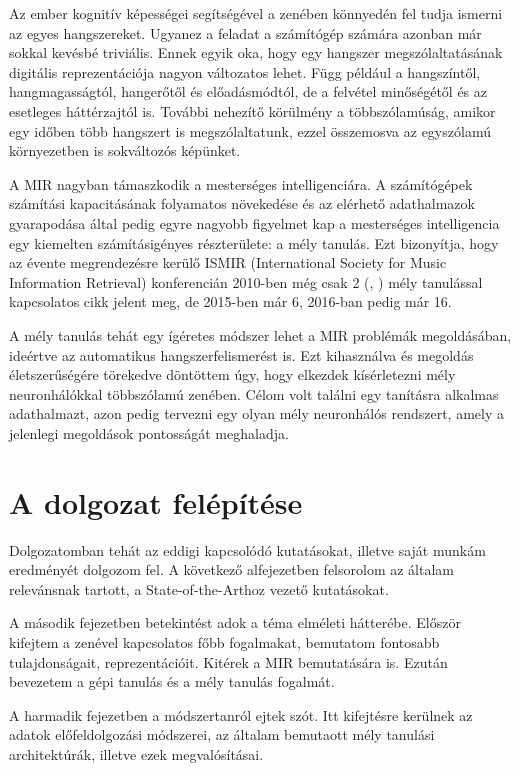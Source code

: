 Az ember kognitív képességei segítségével a zenében könnyedén fel tudja ismerni az egyes hangszereket. Ugyanez a feladat a számítógép számára azonban már sokkal kevésbé triviális. Ennek egyik oka, hogy egy hangszer megszólaltatásának digitális reprezentációja nagyon változatos lehet. Függ például a hangszíntől, hangmagasságtól, hangerőtől és előadásmódtól, de a felvétel minőségétől és az esetleges háttérzajtól is. További nehezítő körülmény a többszólamúság, amikor egy időben több hangszert is megszólaltatunk, ezzel összemosva az egyszólamú környezetben is sokváltozós képünket.

A MIR nagyban támaszkodik a mesterséges intelligenciára. A számítógépek számítási kapacitásának folyamatos növekedése és az elérhető adathalmazok gyarapodása által pedig egyre nagyobb figyelmet kap a mesterséges intelligencia egy kiemelten számításigényes részterülete: a mély tanulás. Ezt bizonyítja, hogy az évente megrendezésre kerülő ISMIR (International Society for Music Information Retrieval) konferencián 2010-ben még csak 2 (\cite{florian2010}, \cite{Hamel2010}) mély tanulással kapcsolatos cikk jelent meg, de 2015-ben már 6, 2016-ban pedig már 16. \cite{choi2017tutorial}

A mély tanulás tehát egy ígéretes módszer lehet a MIR problémák megoldásában, ideértve az automatikus hangszerfelismerést is. Ezt kihasználva és megoldás életszerűségére törekedve döntöttem úgy, hogy elkezdek kísérletezni mély neuronhálókkal többszólamú zenében. Célom volt találni egy tanításra alkalmas adathalmazt, azon pedig tervezni egy olyan mély neuronhálós rendszert, amely a jelenlegi megoldások pontosságát meghaladja.


\section{A dolgozat felépítése}

Dolgozatomban tehát az eddigi kapcsolódó kutatásokat, illetve saját munkám eredményét dolgozom fel. A következő alfejezetben felsorolom az általam relevánsnak tartott, a State-of-the-Arthoz vezető kutatásokat. 

A második fejezetben betekintést adok a téma elméleti hátterébe. Először kifejtem a zenével kapcsolatos főbb fogalmakat, bemutatom fontosabb tulajdonságait, reprezentációit. Kitérek a MIR bemutatására is. Ezután bevezetem a gépi tanulás és a mély tanulás fogalmát. 

A harmadik fejezetben a módszertanról ejtek szót. Itt kifejtésre kerülnek az adatok előfeldolgozási módszerei, az általam bemutaott mély tanulási architektúrák, illetve ezek megvalósításai.

